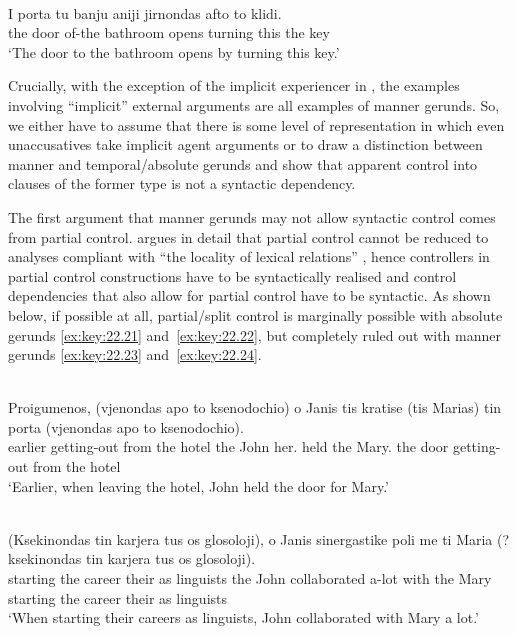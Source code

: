 \documentclass[output=paper]{langsci/langscibook}
\begin{document}
\ea%
    \label{ex:key:22.20} \\
    \gll    I       porta   tu  banju    aniji  jirnondas  afto to  klidi.\\
            the   door    of-the  bathroom  opens  turning      this the  key\\
    \glt    \enquote*{The door to the bathroom opens by turning this key.}
\z

Crucially, with the exception of the implicit experiencer in ,
the examples involving “implicit” external arguments are all examples of manner
gerunds.  So, we either have to assume that there is some level of
representation in which even unaccusatives take implicit agent arguments or to
draw a distinction between manner and temporal/absolute gerunds and show that
apparent control into clauses of the former type is not a syntactic dependency.

The first argument that manner gerunds may not allow syntactic control comes
from partial control. \citet{Landau2010} argues in detail that partial control
cannot be reduced to analyses compliant with “the locality of lexical
relations” \citep[361]{Landau2010}, hence controllers in partial
control constructions
have to be syntactically realised and control dependencies that also allow for
partial control have to be syntactic. As shown below, if possible at all,
partial/split control is marginally possible with absolute gerunds
\eqref{ex:key:22.21} and~\eqref{ex:key:22.22}, but completely ruled out with
manner gerunds \eqref{ex:key:22.23} and~\eqref{ex:key:22.24}.

\ea%
    \label{ex:key:22.21} \\
    \gll    {}Proigumenos, (vjenondas apo   to   ksenodochio) o Janis tis   kratise  (tis Marias)\tss{} tin  porta (vjenondas apo   to   ksenodochio).\\
            earlier \hphantom{(}getting-out     from the hotel the  John her.\Cl{}  held \hphantom{(}the Mary.\Dat{}  the  door  \hphantom{(}getting-out    from the hotel\\
    \glt    \enquote*{Earlier, when leaving the hotel, John held the door for Mary.}
\z

\ea%
\label{ex:key:22.22} \\
    \gll    (Ksekinondas tin karjera tus os glosoloji),  o  Janis  sinergastike  poli   me   ti Maria (?ksekinondas tin karjera tus os glosoloji).\\
            \hphantom{(}starting the career their as linguists  the  John collaborated a-lot with the Mary \hphantom{(?}starting the career their as linguists\\
    \glt    \enquote*{When starting their careers as linguists, John collaborated with Mary a lot.}
\z
\end{document}
